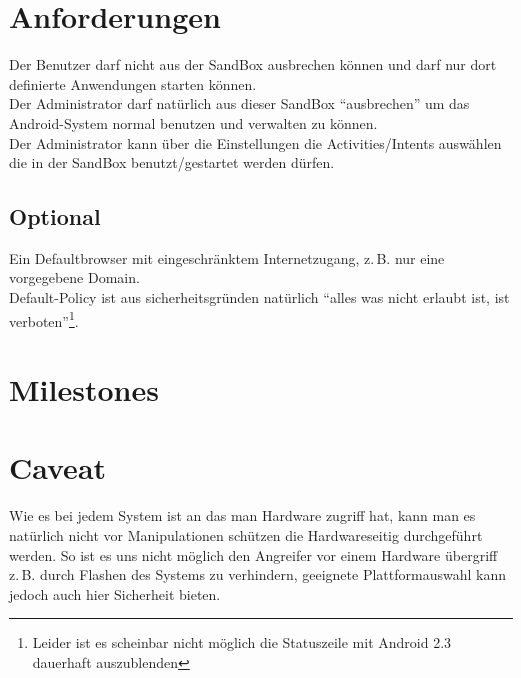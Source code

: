 \documentclass[12pt,a4paper,ngerman]{scrartcl}
\newcommand{\zB}{\mbox{z.\,B.}\xspace}
\begin{document}
\section*{Anforderungen}
Der Benutzer darf nicht aus der SandBox ausbrechen können und darf nur dort definierte Anwendungen starten können. \\
Der Administrator darf natürlich aus dieser SandBox \enquote{ausbrechen} um das Android-System normal benutzen und verwalten zu können. \\
Der Administrator kann über die Einstellungen die Activities/Intents auswählen die in der SandBox benutzt/gestartet werden dürfen.

\subsection*{Optional}
Ein Defaultbrowser mit eingeschränktem Internetzugang, \zB nur eine vorgegebene Domain. \\
Default-Policy ist aus sicherheitsgründen natürlich \enquote{alles was nicht erlaubt ist, ist verboten}\footnote{Leider ist es scheinbar nicht möglich die Statuszeile mit Android 2.3 dauerhaft auszublenden}.

\section*{Milestones}


\section*{Caveat}
Wie es bei jedem System ist an das man Hardware zugriff hat, kann man es natürlich nicht vor Manipulationen schützen die Hardwareseitig durchgeführt werden. So ist es uns nicht möglich den Angreifer vor einem Hardware übergriff \zB durch Flashen des Systems zu verhindern, geeignete Plattformauswahl kann jedoch auch hier Sicherheit bieten.
\end{document}
